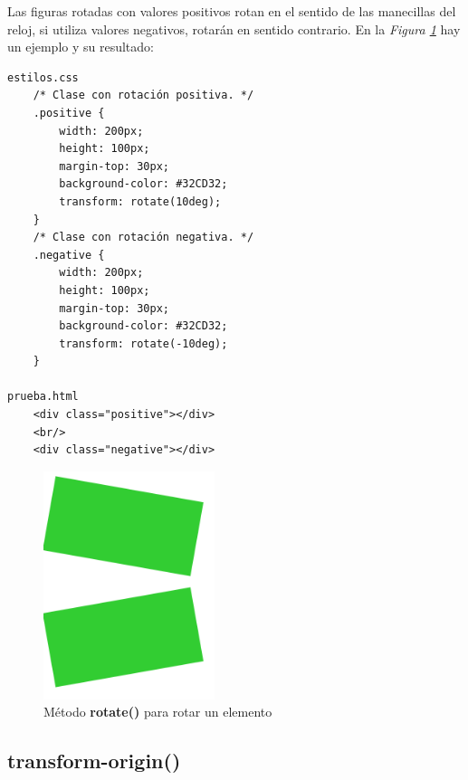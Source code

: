 Las figuras rotadas con valores positivos rotan en el sentido de las manecillas del reloj, si utiliza valores negativos, rotarán en sentido contrario. En la \textit{Figura \ref{fig: 52}} hay un ejemplo y su resultado:
\begin{lstlisting}
estilos.css
    /* Clase con rotación positiva. */
    .positive {
        width: 200px;
        height: 100px;
        margin-top: 30px;
        background-color: #32CD32;
        transform: rotate(10deg);
    }
    /* Clase con rotación negativa. */
    .negative {
        width: 200px;
        height: 100px;
        margin-top: 30px;
        background-color: #32CD32;
        transform: rotate(-10deg);
    }

prueba.html
    <div class="positive"></div>
    <br/>
    <div class="negative"></div>
\end{lstlisting}
\begin{figure}[H]
    \centering
    \caption{Método \textbf{rotate()} para rotar un elemento}
    \label{fig: 52}
    \includegraphics[width=5cm]{ss/rotate.png}
\end{figure}


\subsection{transform-origin()}

